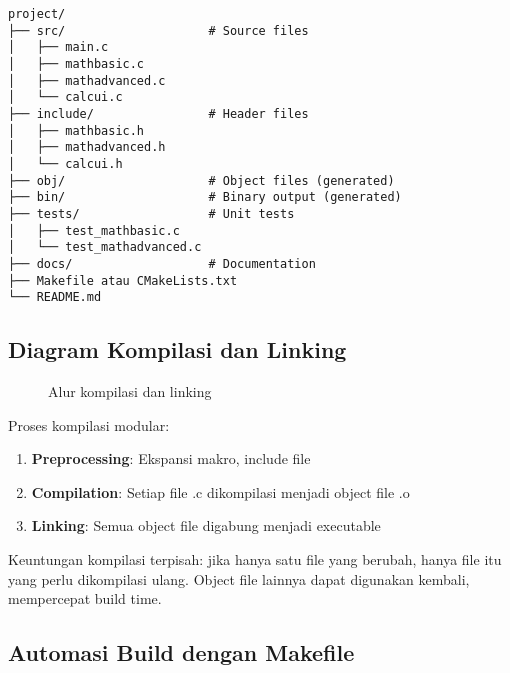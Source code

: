 \documentclass[../main.tex]{subfiles}
\begin{document}
\begin{lstlisting}[caption={Struktur direktori proyek modular}]
project/
├── src/                    # Source files
│   ├── main.c
│   ├── mathbasic.c
│   ├── mathadvanced.c
│   └── calcui.c
├── include/                # Header files
│   ├── mathbasic.h
│   ├── mathadvanced.h
│   └── calcui.h
├── obj/                    # Object files (generated)
├── bin/                    # Binary output (generated)
├── tests/                  # Unit tests
│   ├── test_mathbasic.c
│   └── test_mathadvanced.c
├── docs/                   # Documentation
├── Makefile atau CMakeLists.txt
└── README.md
\end{lstlisting}

\subsection{Diagram Kompilasi dan Linking}
\begin{figure}[H]
  \centering
  \caption{Alur kompilasi dan linking}
\end{figure}

Proses kompilasi modular:
\begin{enumerate}
  \item \textbf{Preprocessing}: Ekspansi makro, include file
  \item \textbf{Compilation}: Setiap file .c dikompilasi menjadi object file .o
  \item \textbf{Linking}: Semua object file digabung menjadi executable
\end{enumerate}

Keuntungan kompilasi terpisah: jika hanya satu file yang berubah, hanya file itu yang perlu dikompilasi ulang. Object file lainnya dapat digunakan kembali, mempercepat build time.

\subsection{Automasi Build dengan Makefile}
\end{document}
